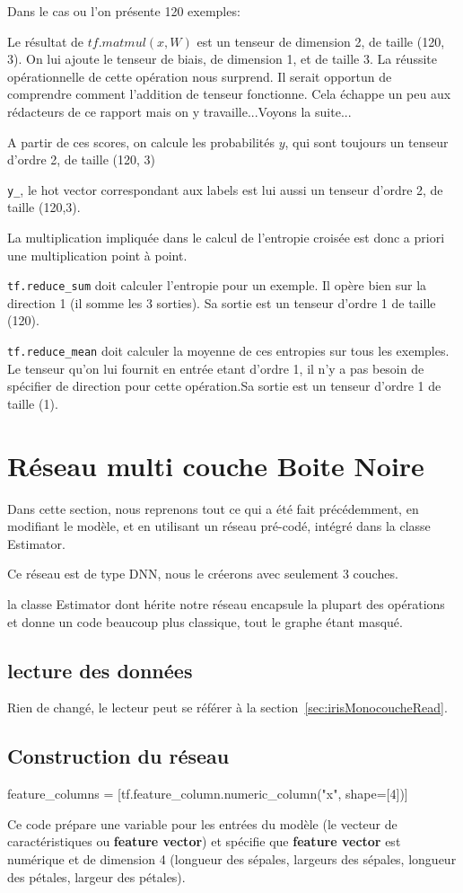 \documentclass[a4paper,11pt]{book}
\begin{document}
Dans le cas ou l'on présente 120 exemples:

Le résultat de $tf.matmul(x,W)$ est un tenseur de dimension 2, de taille (120, 3).
On lui ajoute le tenseur de biais, de dimension 1, et de taille 3.
La réussite opérationnelle de cette opération nous surprend.
Il serait opportun de comprendre comment l'addition de tenseur fonctionne. Cela échappe un peu aux rédacteurs de ce rapport mais on y travaille...Voyons la suite...

A partir de ces scores, on calcule les probabilités $y$, qui sont toujours un tenseur d'ordre 2, de taille (120, 3)

\verb+y_+, le hot vector correspondant aux labels est lui aussi un tenseur d'ordre 2, de taille (120,3).

La multiplication impliquée dans le calcul de l'entropie croisée est donc a priori une multiplication point à point.

\verb+tf.reduce_sum+ doit calculer l'entropie pour un exemple. Il opère bien sur la direction 1 (il somme les 3 sorties). Sa sortie est un tenseur d'ordre 1 de taille (120).

\verb+tf.reduce_mean+ doit calculer la moyenne de ces entropies sur tous les exemples. Le tenseur qu'on lui fournit en entrée etant d'ordre 1, il n'y a pas besoin de spécifier de direction pour cette opération.Sa sortie est un tenseur d'ordre 1 de taille (1).


\section{Réseau multi couche Boite Noire }
Dans cette section, nous reprenons tout ce qui a été fait précédemment, en modifiant le modèle, et en utilisant un réseau pré-codé, intégré dans la classe Estimator.

Ce réseau est de type DNN, nous le créerons avec seulement 3 couches.

la classe Estimator dont hérite notre réseau encapsule la plupart des opérations et donne un code beaucoup plus classique, tout le graphe étant masqué. 

\subsection{lecture des données}
Rien de changé, le lecteur peut se référer à la
section~\ref{sec:irisMonocoucheRead}.

\subsection{Construction du réseau}
\label{sec:irisMulticoucheBuild}
\begin{mypython}
feature_columns = [tf.feature_column.numeric_column("x", shape=[4])]
\end{mypython}
Ce code prépare une variable pour les entrées du modèle (le vecteur de caractéristiques ou \textbf{feature vector}) et spécifie que \textbf{feature vector} est numérique et de dimension 4 (longueur des sépales, largeurs des sépales, longueur des pétales, largeur des pétales).
\end{document}
